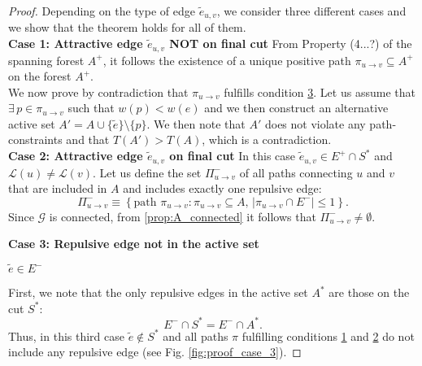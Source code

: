 \documentclass[12pt]{article}
\newcommand\TODO[1]{\fbox{\textcolor{red}{TODO: #1}}}
\begin{document}
\begin{proof}
Depending on the type of edge $\tilde{e}_{u,v}$, we consider three different cases and we show that the theorem holds for all of them. \TODO{Why only three...?}\\

\noindent \textbf{Case 1: Attractive edge $\tilde{e}_{u,v}$ NOT on final cut} 
From Property (4...?) of the spanning forest $A^+$, it follows the existence of a unique positive path $\pi_{u \rightarrow v}\subseteq A^+$ on the forest $A^+$. \\
We now prove by contradiction that $\pi_{u \rightarrow v}$ fulfills condition \hyperref[cond_3]{3}. Let us assume that $\exists \, p\in \pi_{u \rightarrow v}$ such that $w(p)< w(e)$ and we then construct an alternative active set $A'= A \cup \{\tilde{e}\} \setminus \{p\}$. We then note that $A'$ does not violate any path-constraints and that $T(A')>T(A)$, which is a contradiction.\\


\noindent \textbf{Case 2: Attractive edge $\tilde{e}_{u,v}$ on final cut}  
In this case $\tilde{e}_{u,v} \in E^+ \cap S^* $ and $\mathcal{L}(u)\neq\mathcal{L}(v)$. Let us define the set $\Pi_{u \rightarrow v}^-$ of all paths connecting $u$ and $v$ that are included in $A$ and includes exactly one repulsive edge: 
\begin{equation}
\Pi_{u \rightarrow v}^- \equiv \left\{ \mathrm{path} \,\, \pi_{u \rightarrow v}  : \pi_{u \rightarrow v} \subseteq A, \, \left| \pi_{u \rightarrow v} \cap E^{-}  \right| \leq 1 \right \}.
\end{equation}  
Since $\mathcal{G}$ is connected, from \autoref{prop:A_connected} it follows that $\Pi_{u \rightarrow v}^- \neq \emptyset$.



\noindent \textbf{Case 3: Repulsive edge not in the active set} 

$\tilde{e} \in E^-$


First, we note that the only repulsive edges in the active set $A^*$ are those on the cut $S^*$:
\begin{equation}
E^- \cap S^* = E^- \cap A^*.
\end{equation}
 Thus, in this third case $\tilde{e} \notin S^*$ and all paths $\pi$ \TODO{introduce a new notation..?} fulfilling conditions \hyperref[cond_1]{1} and \hyperref[cond_2]{2} do not include any repulsive edge (see Fig. \ref{fig:proof_case_3}). 
\end{proof}
\end{document}
